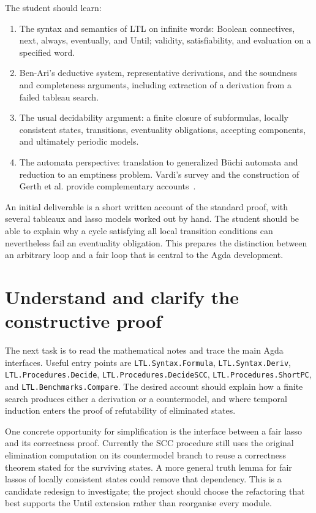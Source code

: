 \documentclass[11pt,a4paper]{article}
\begin{document}
The student should learn:
\begin{enumerate}
\item The syntax and semantics of LTL on infinite words: Boolean
connectives, next, always, eventually, and Until; validity,
satisfiability, and evaluation on a specified word.
\item Ben-Ari's deductive system, representative derivations, and the
soundness and completeness arguments, including extraction of a
derivation from a failed tableau search.
\item The usual decidability argument: a finite closure of subformulas,
locally consistent states, transitions, eventuality obligations,
accepting components, and ultimately periodic models.
\item The automata perspective: translation to generalized B\"uchi
automata and reduction to an emptiness problem. Vardi's survey
and the construction of Gerth et al. provide complementary
accounts~\cite{vardi,gerth}.
\end{enumerate}

An initial deliverable is a short written account of the standard proof,
with several tableaux and lasso models worked out by hand. The student
should be able to explain why a cycle satisfying all local transition
conditions can nevertheless fail an eventuality obligation. This prepares
the distinction between an arbitrary loop and a fair loop that is central
to the Agda development.

\section{Understand and clarify the constructive proof}

The next task is to read the mathematical notes and trace the main Agda
interfaces. Useful entry points are \texttt{LTL.Syntax.Formula},
\texttt{LTL.Syntax.Deriv}, \texttt{LTL.Procedures.Decide}, \texttt{LTL.Procedures.DecideSCC},
\texttt{LTL.Procedures.ShortPC}, and \texttt{LTL.Benchmarks.Compare}.
The desired account should explain how a finite search produces either
a derivation or a countermodel, and where temporal induction enters the
proof of refutability of eliminated states.

One concrete opportunity for simplification is the interface between a
fair lasso and its correctness proof. Currently the SCC procedure still
uses the original elimination computation on its countermodel branch to
reuse a correctness theorem stated for the surviving states. A more
general truth lemma for fair lassos of locally consistent states could
remove that dependency. This is a candidate redesign to investigate;
the project should choose the refactoring that best supports the Until
extension rather than reorganise every module.
\end{document}
